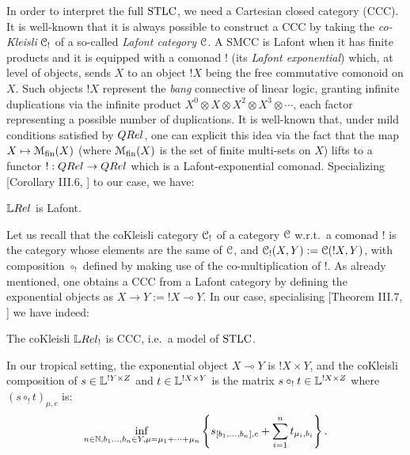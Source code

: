 
In order to interpret the full $\mathrm{STLC}$, we need a Cartesian closed category (CCC).
It is well-known \cite{Mellies2009} that it is always possible to construct a CCC by taking the \emph{co-Kleisli} $\mathcal{C}_!$ of a so-called \emph{Lafont category} $\mathcal{C}$.
A SMCC is Lafont when it has finite products and it is equipped with a comonad $!$ (its \emph{Lafont exponential}) which, at level of objects, sends $X$ to an object $!X$ being the free commutative comonoid on $X$.
Such objects $!X$ represent the \emph{bang} connective of linear logic, granting infinite duplications via the infinite product $X^0\otimes X\otimes X^2\otimes X^3\otimes\cdots$, each factor representing a possible number of duplications.
It is well-known that, under mild conditions satisfied by $\QREL$, one can explicit this idea via the fact that the map $X\mapsto \mathcal{M}_{\mathrm{fin}}(X)$ (where $\mathcal{M}_{\mathrm{fin}}(X)$ is the set of finite multi-sets on $X$) lifts to a functor $!:\QREL\to\QREL$ which is a Lafont-exponential comonad.
Specializing [Corollary III.6, \cite{Manzo2013}] to our case, we have:

\begin{fact}
 $\LREL$ is Lafont.
\end{fact}

Let us recall that the coKleisli category $\mathcal{C}_!$ of a category $\mathcal{C}$ w.r.t.\ a comonad $!$ is the category whose elements are the same of $\mathcal{C}$, and ${\mathcal{C}_!}(X,Y):={\mathcal{C}}(!X,Y)$, with composition $\circ_!$ defined by making use of the co-multiplication of $!$.
As already mentioned, one obtains a CCC from a Lafont category by defining the exponential objects as $X\to Y:=!X \multimap Y$.
In our case, specialising [Theorem III.7, \cite{Manzo2013}] we have indeed:
\begin{fact}
 The coKleisli $\LREL_!$ is CCC, i.e.\ a model of $\mathrm{STLC}$.
\end{fact}

In our tropical setting, 
the exponential object $X\multimap Y$ is $!X\times Y$, and 
the coKleisli composition of $s\in\mathbb{L}^{!Y\times Z}$ and $t\in\mathbb{L}^{!X\times Y}$ is the matrix $s\circ_! t\in\mathbb{L}^{!X\times Z}$ where $(s\circ_! t)_{\mu,c}$ is:
\begin{align}
 \inf\limits_{n\in\mathbb{N}, b_1\dots,b_n\in Y, \mu = \mu_1+\cdots +\mu_n}
 \left\{s_{[b_1,\dots,b_n],c} + \sum\limits_{i=1}^n t_{\mu_i,b_i}\right\}.
\end{align}

